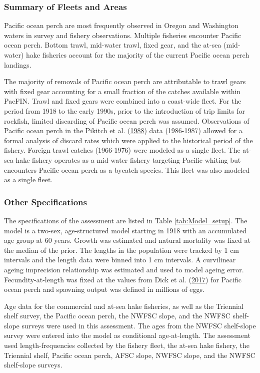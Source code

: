 \documentclass[12pt,]{article}
\begin{document}
\subsubsection{Summary of Fleets and
Areas}\label{summary-of-fleets-and-areas}

Pacific ocean perch are most frequently observed in Oregon and
Washington waters in survey and fishery observations. Multiple fisheries
encounter Pacific ocean perch. Bottom trawl, mid-water trawl, fixed
gear, and the at-sea (mid-water) hake fisheries account for the majority
of the current Pacific ocean perch landings.

The majority of removals of Pacific ocean perch are attributable to
trawl gears with fixed gear accounting for a small fraction of the
catches available within PacFIN. Trawl and fixed gears were combined
into a coast-wide fleet. For the period from 1918 to the early 1990s,
prior to the introduction of trip limits for rockfish, limited
discarding of Pacific ocean perch was assumed. Observations of Pacific
ocean perch in the Pikitch et al.
(\protect\hyperlink{ref-pikitch_evaluation_1988}{1988}) data (1986-1987)
allowed for a formal analysis of discard rates which were applied to the
historical period of the fishery. Foreign trawl catches (1966-1976) were
modeled as a single fleet. The at-sea hake fishery operates as a
mid-water fishery targeting Pacific whiting but encounters Pacific ocean
perch as a bycatch species. This fleet was also modeled as a single
fleet.

\subsubsection{Other Specifications}\label{other-specifications}

The specifications of the assessment are listed in Table
\ref{tab:Model_setup}. The model is a two-sex, age-structured model
starting in 1918 with an accumulated age group at 60 years. Growth was
estimated and natural mortality was fixed at the median of the prior.
The lengths in the population were tracked by 1 cm intervals and the
length data were binned into 1 cm intervals. A curvilinear ageing
imprecision relationship was estimated and used to model ageing error.
Fecundity-at-length was fixed at the values from Dick et al.
(\protect\hyperlink{ref-dick_meta-analysis_2017}{2017}) for Pacific
ocean perch and spawning output was defined in millions of eggs.

Age data for the commercial and at-sea hake fisheries, as well as the
Triennial shelf survey, the Pacific ocean perch, the NWFSC slope, and
the NWFSC shelf-slope surveys were used in this assessment. The ages
from the NWFSC shelf-slope survey were entered into the model as
conditional age-at-length. The assessment used length-frequencies
collected by the fishery fleet, the at-sea hake fishery, the Triennial
shelf, Pacific ocean perch, AFSC slope, NWFSC slope, and the NWFSC
shelf-slope surveys.
\end{document}
